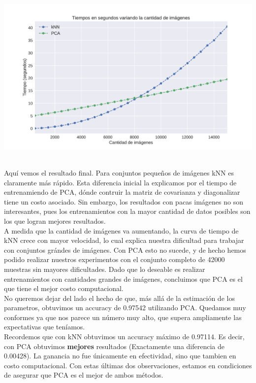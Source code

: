 {\centering
    \includegraphics[scale=0.60]{informe/imagenes/tiemposKnnVsPsa.pdf} \\
}
$ $\newline

Aquí vemos el resultado final. Para conjuntos pequeños de imágenes kNN es claramente más rápido. Esta diferencia inicial la explicamos por el tiempo de entrenamiendo de PCA, dónde contruir la matriz de covarianza y diagonalizar tiene un costo asociado. Sin embargo, los resultados con pacas imágenes no son interesantes, pues los entrenamientos con la mayor cantidad de datos posibles son los que logran mejores resultados. \\

A medida que la cantidad de imágenes va aumentando, la curva de tiempo de kNN crece con mayor velocidad, lo cual explica nuestra dificultad para trabajar con conjuntos grándes de imágenes. Con PCA esto no sucede, y de hecho hemos podido realizar nuestros experimentos con el conjunto completo de 42000 muestras sin mayores dificultades. Dado que lo deseable es realizar entrenamientos con cantidades grandes de imágenes, concluimos que PCA es el que tiene el mejor costo computacional. \\

No queremos dejar del lado el hecho de que, más allá de la estimación de los parametros, obtuvimos un accuracy de 0.97542 utilizando PCA. Quedamos muy conformes ya que nos parece un número muy alto, que supera ampliamente las expectativas que teníamos. \\

Recordemos que con kNN obtuvimos un accuracy máximo de 0.97114. Es decir, con PCA obtuvimos \textbf{mejores} resultados (Exactamente una diferencia de 0.00428). La ganancia no fue únicamente en efectividad, sino que tambien en costo computacional. Con estas últimas dos observaciones, estamos en condiciones de asegurar que PCA es el mejor de ambos métodos. \\



